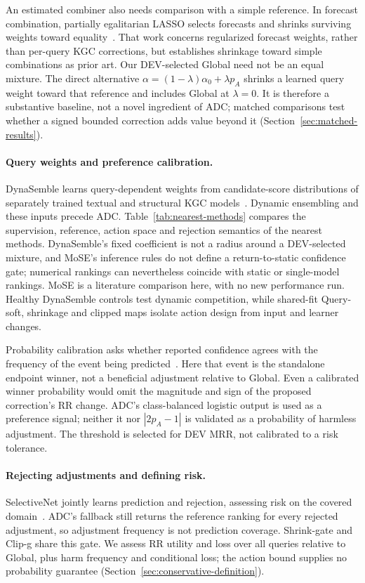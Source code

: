 \documentclass[11pt,a4paper]{article}
\begin{document}
An estimated combiner also needs comparison with a simple reference. In forecast combination, partially egalitarian LASSO selects forecasts and shrinks surviving weights toward equality~\citep{diebold_shin2019}. That work concerns regularized forecast weights, rather than per-query KGC corrections, but establishes shrinkage toward simple combinations as prior art. Our DEV-selected Global need not be an equal mixture. The direct alternative $\alpha=(1-\lambda)\alpha_0+\lambda p_A$ shrinks a learned query weight toward that reference and includes Global at $\lambda=0$. It is therefore a substantive baseline, not a novel ingredient of ADC; matched comparisons test whether a signed bounded correction adds value beyond it (Section~\ref{sec:matched-results}).

\paragraph{Query weights and preference calibration.}
DynaSemble learns query-dependent weights from candidate-score distributions of separately trained textual and structural KGC models~\citep{dynasemble}. Dynamic ensembling and these inputs precede ADC. Table~\ref{tab:nearest-methods} compares the supervision, reference, action space and rejection semantics of the nearest methods. DynaSemble's fixed coefficient is not a radius around a DEV-selected mixture, and MoSE's inference rules do not define a return-to-static confidence gate; numerical rankings can nevertheless coincide with static or single-model rankings. MoSE is a literature comparison here, with no new performance run. Healthy DynaSemble controls test dynamic competition, while shared-fit Query-soft, shrinkage and clipped maps isolate action design from input and learner changes.

Probability calibration asks whether reported confidence agrees with the frequency of the event being predicted~\citep{guo2017}. Here that event is the standalone endpoint winner, not a beneficial adjustment relative to Global. Even a calibrated winner probability would omit the magnitude and sign of the proposed correction's RR change. ADC's class-balanced logistic output is used as a preference signal; neither it nor $|2p_A-1|$ is validated as a probability of harmless adjustment. The threshold is selected for DEV MRR, not calibrated to a risk tolerance.


\paragraph{Rejecting adjustments and defining risk.}
SelectiveNet jointly learns prediction and rejection, assessing risk on the covered domain~\citep{selectivenet}. ADC's fallback still returns the reference ranking for every rejected adjustment, so adjustment frequency is not prediction coverage. Shrink-gate and Clip-g share this gate. We assess RR utility and loss over all queries relative to Global, plus harm frequency and conditional loss; the action bound supplies no probability guarantee (Section~\ref{sec:conservative-definition}).
\end{document}

